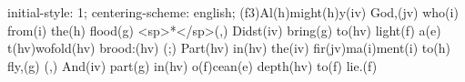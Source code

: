 initial-style: 1;
centering-scheme: english;
(f3)Al(h)might(h)y(iv) God,(jv) who(i) from(i) the(h) flood(g) <sp>*</sp>(,)
Didst(iv) bring(g) to(hv) light(f) a(e) t(hv)wofold(hv) brood:(hv) (;)
Part(hv) in(hv) the(iv) fir(jv)ma(i)ment(i) to(h) fly,(g) (,)
And(iv) part(g) in(hv) o(f)cean(e) depth(hv) to(f) lie.(f)
